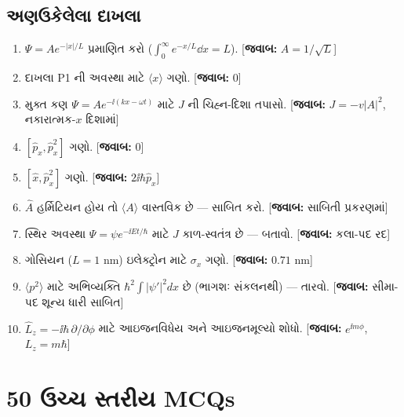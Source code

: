\subsection{અણઉકેલેલા દાખલા}
\begin{enumerate}[label=\textbf{P\arabic*.}]
  \item $\Psi=Ae^{-|x|/L}$ પ્રમાણિત કરો ($\int_0^\infty e^{-x/L}\dd x=L$). \hfill [\textbf{જવાબ:} $A=1/\sqrt L$]
  \item દાખલા P1 ની અવસ્થા માટે $\langle x\rangle$ ગણો. \hfill [\textbf{જવાબ:} $0$]
  \item મુક્ત કણ $\Psi=Ae^{-\ii(kx-\omega t)}$ માટે $J$ ની ચિહ્ન-દિશા તપાસો. \hfill [\textbf{જવાબ:} $J=-v|A|^{2}$, નકારાત્મક-$x$ દિશામાં]
  \item $[\hat p_x,\hat p_x^{2}]$ ગણો. \hfill [\textbf{જવાબ:} $0$]
  \item $[\hat x,\hat p_x^{2}]$ ગણો. \hfill [\textbf{જવાબ:} $2\ii\hbar\hat p_x$]
  \item $\hat A$ હર્મિટિયન હોય તો $\langle A\rangle$ વાસ્તવિક છે — સાબિત કરો. \hfill [\textbf{જવાબ:} સાબિતી પ્રકરણમાં]
  \item સ્થિર અવસ્થા $\Psi=\psi e^{-\ii Et/\hbar}$ માટે $J$ કાળ-સ્વતંત્ર છે — બતાવો. \hfill [\textbf{જવાબ:} કલા-પદ રદ]
  \item ગોસિયન ($L=1$ nm) ઇલેક્ટ્રોન માટે $\sigma_x$ ગણો. \hfill [\textbf{જવાબ:} $0.71$ nm]
  \item $\langle p^{2}\rangle$ માટે અભિવ્યક્તિ $\hbar^2\int|\psi'|^2dx$ છે (ભાગશઃ સંકલનથી) — તારવો. \hfill [\textbf{જવાબ:} સીમા-પદ શૂન્ય ધારી સાબિત]
  \item $\hat L_z=-\ii\hbar\,\partial/\partial\phi$ માટે આઇજનવિધેય અને આઇજનમૂલ્યો શોધો. \hfill [\textbf{જવાબ:} $e^{\ii m\phi}$, $L_z=m\hbar$]
\end{enumerate}

\section{50 ઉચ્ચ સ્તરીય MCQs}

